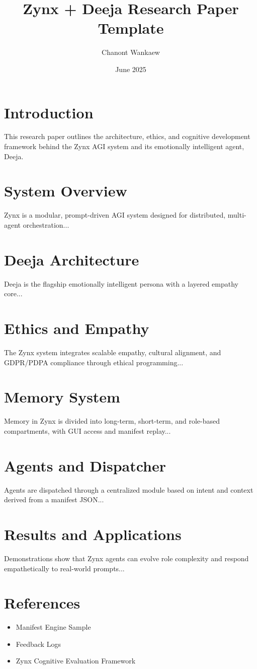 \documentclass[11pt]{article}
\title{\textbf{Zynx + Deeja Research Paper Template}}
\author{Chanont Wankaew}
\date{June 2025}
\begin{document}
\maketitle
\tableofcontents
\newpage

\section{Introduction}
This research paper outlines the architecture, ethics, and cognitive development framework behind the Zynx AGI system and its emotionally intelligent agent, Deeja.

\section{System Overview}
Zynx is a modular, prompt-driven AGI system designed for distributed, multi-agent orchestration...

\section{Deeja Architecture}
Deeja is the flagship emotionally intelligent persona with a layered empathy core...

\section{Ethics and Empathy}
The Zynx system integrates scalable empathy, cultural alignment, and GDPR/PDPA compliance through ethical programming...

\section{Memory System}
Memory in Zynx is divided into long-term, short-term, and role-based compartments, with GUI access and manifest replay...

\section{Agents and Dispatcher}
Agents are dispatched through a centralized module based on intent and context derived from a manifest JSON...

\section{Results and Applications}
Demonstrations show that Zynx agents can evolve role complexity and respond empathetically to real-world prompts...

\section{References}
\begin{itemize}
  \item Manifest Engine Sample
  \item Feedback Logs
  \item Zynx Cognitive Evaluation Framework
\end{itemize}
\end{document}
